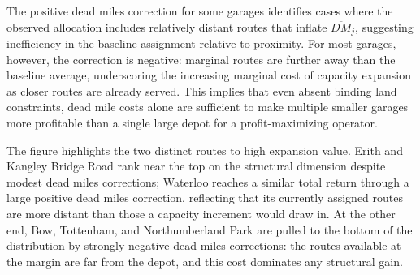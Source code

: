 \documentclass[12pt]{article}
\begin{document}
The positive dead miles correction for some garages identifies cases where
the observed allocation includes relatively distant routes that inflate
$\overline{DM}_j$, suggesting inefficiency in the baseline assignment
relative to proximity. For most garages, however, the correction is negative:
marginal routes are further away than the baseline average, underscoring the
increasing marginal cost of capacity expansion as closer routes are already
served. This implies that even absent binding land constraints, dead mile
costs alone are sufficient to make multiple smaller garages more profitable
than a single large depot for a profit-maximizing operator.
 
The figure highlights the two distinct routes to high expansion value. Erith
and Kangley Bridge Road rank near the top on the structural dimension despite
modest dead miles corrections; Waterloo reaches a similar total return
through a large positive dead miles correction, reflecting that its currently
assigned routes are more distant than those a capacity increment would draw
in. At the other end, Bow, Tottenham, and Northumberland Park are pulled to
the bottom of the distribution by strongly negative dead miles corrections:
the routes available at the margin are far from the depot, and this cost
dominates any structural gain.
 
\end{document}
